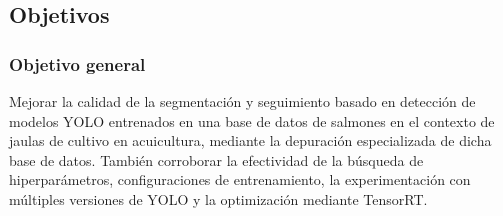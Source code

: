 



\subsection{Objetivos}
\subsubsection{Objetivo general}

Mejorar la calidad de la segmentación y seguimiento basado en detección de modelos YOLO entrenados en una base de datos de salmones en el contexto de jaulas de cultivo en acuicultura, mediante la depuración especializada de dicha base de datos. También corroborar la efectividad de la búsqueda de hiperparámetros, configuraciones de entrenamiento, la experimentación con múltiples versiones de YOLO y la optimización mediante TensorRT.

